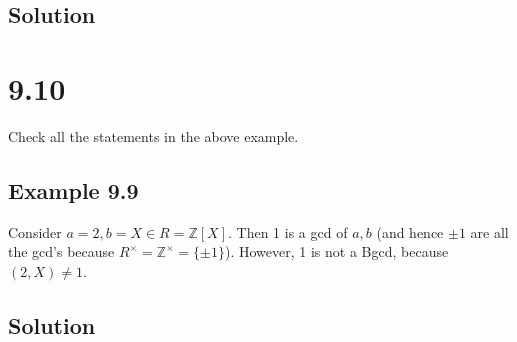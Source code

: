 \documentclass[fleqn]{article}
\begin{document}
        \subsection{Solution}
        
    
    \section{9.10}
    Check all the statements in the above example.
    
        \subsection{Example 9.9}
        Consider $a = 2, b = X \in R = \mathbb{Z}[X]$.  Then 1 is a gcd of $a, b$ (and hence $\pm 1$ are all the gcd's because $R^\times = \mathbb{Z}^\times = \{\pm 1\}$).  However, 1 is not a Bgcd, because $(2, X) \neq 1$.
        
        \subsection{Solution}
        
    
\end{document}
